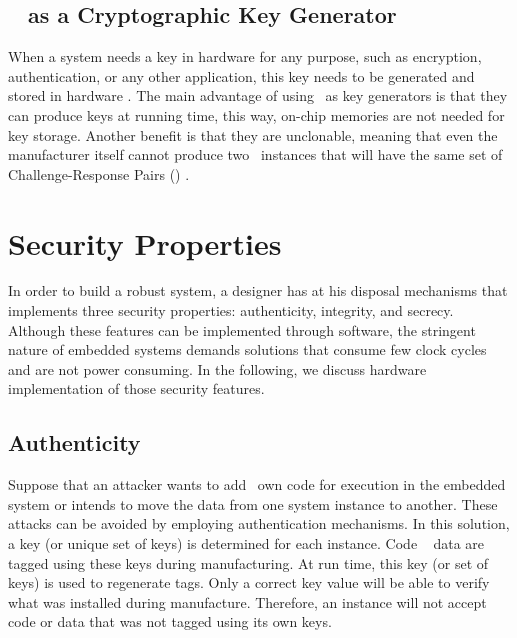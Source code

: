 \subsection{\puf~ as a Cryptographic  Key Generator }
When a system needs a key in hardware for any purpose, such as encryption, authentication, or any other application, this key needs to be generated and stored in hardware \cite{puf-key-devadas-1278484}. The main advantage of using \pufs~as key generators is that they can produce keys at running time, this way, on-chip memories are not needed for key storage. Another benefit is that they are unclonable, meaning that even the manufacturer itself cannot produce two \puf~instances that will have the same set of Challenge-Response Pairs (\crps) \cite{Gassend2002:PUFs}. 


\section{Security Properties}
\label{sec:securityproperties}
In order to build a robust system, a designer has at his disposal mechanisms that implements three security properties: authenticity, integrity, and secrecy. Although these features can be implemented through software, the stringent nature of embedded systems demands solutions that consume few clock cycles and are not power consuming.
In the following, we discuss hardware implementation of those security features.

\subsection{Authenticity}
\label{subsec:Authenticity}
Suppose that an attacker wants to add \hisher~own code for execution in the embedded system or intends to move the data from one system instance to another. These attacks can be avoided by employing authentication mechanisms. In this solution, a key (or unique set of keys) is determined for each instance.
Code \andor~ data are tagged using these keys during manufacturing.  At run time, this key (or set of keys) is used to regenerate tags. Only a correct key value will be able to verify what was installed during manufacture. Therefore, an instance will not accept code or data that was not tagged using its own keys.

